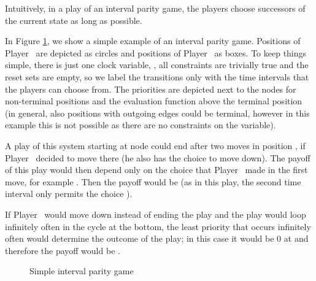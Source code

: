 \documentclass[fleqn,envcountsame]{LMCS}
\newcommand{\pzero}{Player~\xspace}
\newcommand{\pone}{Player~\xspace}
\begin{document}
Intuitively, in a play of an interval parity game, the players choose
successors of the current state as long as possible.
\begin{exa}
In Figure \ref{ipg}, we show a simple example of an interval parity game.
Positions of \pzero are depicted as circles and positions of \pone
as boxes. To keep things simple, there is just one clock variable, 
, all constraints are trivially true and the reset
sets are empty, so we label the transitions only with the time intervals
that the players can choose from. 
The priorities are depicted next to the nodes for non-terminal
positions and the evaluation function above the terminal position (in general, also
positions with outgoing edges could be terminal, however in this example this is
not possible as there are no constraints on the variable).

A play of this system starting at node  could end after two
moves in position , if \pone decided to move there (he also has the choice to
move down). 
The payoff of this play would then
depend only on the choice that \pzero made in the first move, for example . 
Then the payoff would be
 (as in this 
play, the second time interval only permits the choice ).

If \pone would move down instead
of ending the play and the play would loop infinitely often in the cycle 
at the bottom, the least priority that occurs infinitely often would 
determine the outcome of the play; in this case it would be 0 at  and therefore
the payoff would be .
\end{exa}
\begin{figure}[h]\label{ipg}
\begin{center}
\end{center}
\caption{Simple interval parity game} 
\end{figure}
\end{document}
